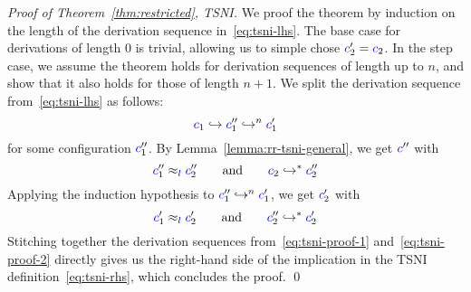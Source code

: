 \documentclass{llncs}
\begin{document}
\begin{proof}[Proof of Theorem~\ref{thm:restricted}, TSNI]
We proof the theorem by induction on the length of the derivation sequence in~\eqref{eq:tsni-lhs}.
  The base case for derivations
  of length 0 is trivial, allowing
  us to simple chose ${\color{blue} c}_{2}'\mathrel{=}{\color{blue} c}_{2}$.  In the step case, we assume
  the theorem holds for derivation sequences of length up to $n$, and show that it also
  holds for those of length $n+1$.  We split the derivation sequence from~\eqref{eq:tsni-lhs} as follows:
  \[
  {\color{blue} c}_{1} \hookrightarrow {\color{blue} c}_{1}'' \hookrightarrow^n {\color{blue} c}_{1}'
  \]
  for some configuration \ensuremath{\ifc{c}_{1}''}.  By Lemma~\ref{lemma:rr-tsni-general}, we get
  \ensuremath{\ifc{c}''} with
  \begin{equation} \label{eq:tsni-proof-1}
  {\color{blue} c}_{1}'' \approx_{{\color{blue} l}} {\color{blue} c}_{2}''
  \qquad \text{and} \qquad
  {\color{blue} c}_{2} \hookrightarrow^* {\color{blue} c}_{2}''
  \end{equation}
  Applying the induction hypothesis to
  ${\color{blue} c}_{1}'' \hookrightarrow^n {\color{blue} c}_{1}'$, we get \ensuremath{\ifc{c}_{2}'} with
  \begin{equation} \label{eq:tsni-proof-2}
  {\color{blue} c}_{1}' \approx_{{\color{blue} l}} {\color{blue} c}_{2}'
  \qquad \text{and} \qquad
  {\color{blue} c}_{2}'' \hookrightarrow^* {\color{blue} c}_{2}'
  \end{equation}
  Stitching together the derivation sequences from~\eqref{eq:tsni-proof-1} and~\eqref{eq:tsni-proof-2} directly gives
  us the right-hand side of the implication in the TSNI
  definition~\eqref{eq:tsni-rhs}, which concludes the proof.
  \qed
\end{proof}








\fi
\end{document}
